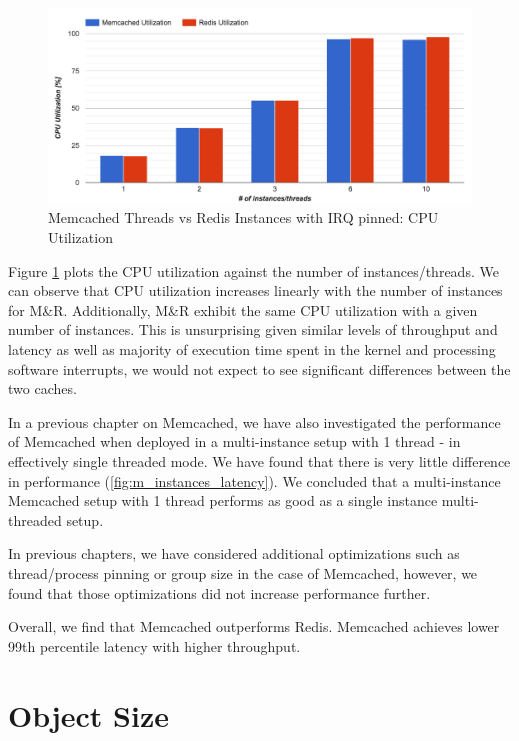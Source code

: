 \begin{figure}[h]
    \includegraphics[width=\textwidth]{./res2/mr_irq_cpu.png}
    \caption{Memcached Threads vs Redis Instances with IRQ pinned: CPU Utilization}
    \label{fig:mr_irq_cpu}
\end{figure}

Figure \ref{fig:mr_irq_cpu} plots the CPU utilization against the number of instances/threads. We can observe that CPU utilization increases linearly with the number of instances for M\&R. Additionally, M\&R exhibit the same CPU utilization with a given number of instances. This is unsurprising given similar levels of throughput and latency as well as majority of execution time spent in the kernel and processing software interrupts, we would not expect to see significant differences between the two caches.

In a previous chapter on Memcached, we have also investigated the performance of Memcached when deployed in a multi-instance setup with 1 thread - in effectively single threaded mode. We have found that there is very little difference in performance (\ref{fig:m_instances_latency}). We concluded that a multi-instance Memcached setup with 1 thread performs as good as a single instance multi-threaded setup.

In previous chapters, we have considered additional optimizations such as thread/process pinning or group size in the case of Memcached, however, we found that those optimizations did not increase performance further.

Overall, we find that Memcached outperforms Redis. Memcached achieves lower 99th percentile latency with higher throughput.

\section{Object Size}

